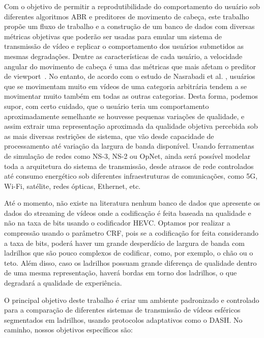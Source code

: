 Com o objetivo de permitir a reprodutibilidade do comportamento do usuário sob diferentes algoritmos ABR e preditores de movimento de cabeça, este trabalho propõe um fluxo de trabalho e a construção de um banco de dados com diversas métricas objetivas que poderão ser usadas para emular um sistema de transmissão de vídeo e replicar o comportamento dos usuários submetidos as mesmas degradações. Dentre as características de cada usuário, a velocidade angular do movimento de cabeça é uma das métricas que mais afetam o preditor de viewport~\cite{Qian2016}. No entanto, de acordo com o estudo de Nasrabadi et al. \cite{Nasrabadi2019}, usuários que se movimentam muito em vídeos de uma categoria arbitrária tendem a se movimentar muito também em todas as outras categorias. Desta forma, podemos supor, com certo cuidado, que o usuário teria um comportamento aproximadamente semelhante se houvesse pequenas variações de qualidade, e assim extrair uma representação aproximada da qualidade objetiva percebida sob as mais diversas restrições de sistema, que vão desde capacidade de processamento até variação da largura de banda disponível. Usando ferramentas de simulação de redes como NS-3, NS-2 ou OpNet, ainda será possível modelar toda a arquitetura do sistema de transmissão, desde atrasos de rede controlados até consumo energético sob diferentes infraestruturas de comunicações, como 5G, Wi-Fi, satélite, redes ópticas, Ethernet, etc.

Até o momento, não existe na literatura nenhum banco de dados que apresente os dados do streaming de vídeos onde a codificação é feita baseada na qualidade e não na taxa de bits usando o codificador HEVC. Optamos por realizar a compressão usando o parâmetro CRF, pois se a codificação for feita considerando a taxa de bits, poderá haver um grande desperdício de largura de banda com ladrilhos que são pouco complexos de codificar, como, por exemplo, o chão ou o teto. Além disso, caso os ladrilhos possuam grande diferença de qualidade dentro de uma mesma representação, haverá bordas em torno dos ladrilhos, o que degradará a qualidade de experiência.

O principal objetivo deste trabalho é criar um ambiente padronizado e controlado para a comparação de diferentes sistemas de transmissão de vídeos esféricos segmentados em ladrilhos, usando protocolos adaptativos como o DASH. No caminho, nossos objetivos específicos são:

